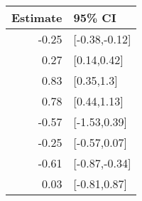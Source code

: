 \begin{tabular}{rl}
  \hline
Estimate & 95\% CI \\ 
  \hline
-0.25 & [-0.38,-0.12] \\ 
  0.27 & [0.14,0.42] \\ 
  0.83 & [0.35,1.3] \\ 
  0.78 & [0.44,1.13] \\ 
  -0.57 & [-1.53,0.39] \\ 
  -0.25 & [-0.57,0.07] \\ 
  -0.61 & [-0.87,-0.34] \\ 
  0.03 & [-0.81,0.87] \\ 
   \hline
\end{tabular}

